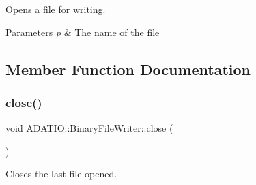 Opens a file for writing. 
\begin{DoxyParams}{Parameters}
{\em p} & The name of the file \\
\hline
\end{DoxyParams}


\subsection{Member Function Documentation}
\mbox{\label{classADATIO_1_1BinaryFileWriter_a20a1bdb753aaf28e60de49e80ddf953d}} 
\subsubsection{\texorpdfstring{close()}{close()}\hspace{0.1cm}{\footnotesize\ttfamily [1/3]}}
{\footnotesize\ttfamily void A\+D\+A\+T\+I\+O\+::\+Binary\+File\+Writer\+::close (\begin{DoxyParamCaption}{ }\end{DoxyParamCaption})}



Closes the last file opened. 

